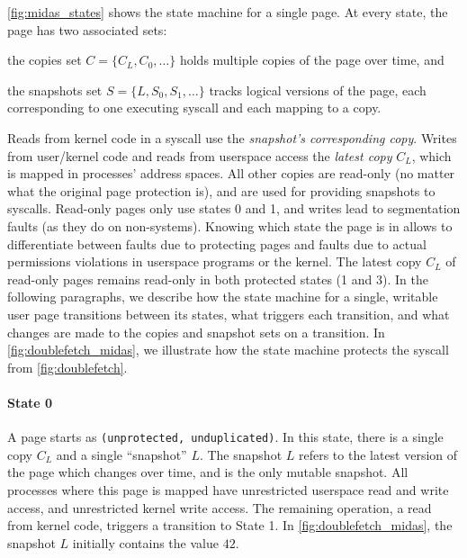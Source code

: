 \autoref{fig:midas_states} shows the state machine for a single page.
At every state, the page has two associated sets:
\begin{inparaenum}
  \item the copies set $C = \{C_L, C_0, \dots\}$ holds multiple copies of the page over time, and
  \item the snapshots set $S = \{L, S_0, S_1, \dots\}$ tracks logical versions of the page, each corresponding to one executing syscall and each mapping to a copy.
\end{inparaenum}
Reads from kernel code in a syscall use the \emph{snapshot's corresponding copy}.
Writes from user/kernel code and reads from userspace access the \emph{latest
copy} $C_L$, which is mapped in processes' address spaces.
All other copies are read-only (no matter what the original page protection is), and are used for providing snapshots to syscalls.
Read-only pages only use states 0 and 1, and writes lead to segmentation faults
(as they do on non-\midas systems).
Knowing which state the page is in allows \midas to differentiate between
faults due to \midas protecting pages and faults due to actual permissions
violations in userspace programs or the kernel.
The latest copy $C_L$ of read-only pages remains read-only in both
protected states (1 and 3).
In the following paragraphs, we describe how the state machine for a single,
writable user page transitions between its states, what triggers each transition,
and what changes are made to the copies and snapshot sets on a transition.
In \autoref{fig:doublefetch_midas}, we illustrate how the state machine protects the
syscall from \autoref{fig:doublefetch}.

\paragraph{State 0}
A page starts as \texttt{(unprotected, unduplicated)}.
In this state, there is a single copy $C_L$ and a single ``snapshot'' $L$.
The snapshot $L$ refers to the latest version of the page which changes
over time, and is the only mutable snapshot.
All processes where this page is mapped have unrestricted userspace read and write
access, and unrestricted kernel write access.
The remaining operation, a read from kernel code, triggers a transition to
State 1.
In \autoref{fig:doublefetch_midas}, the snapshot $L$ initially contains
the value $42$.

